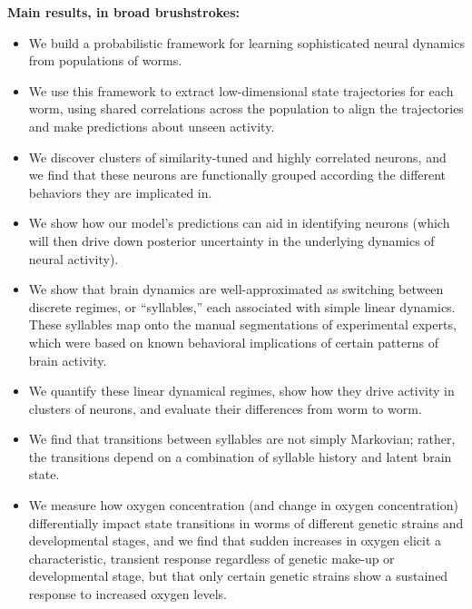 \documentclass[11pt]{article}
\begin{document}
\textbf{Main results, in broad brushstrokes:}
\begin{itemize}
\item We build a probabilistic framework for learning sophisticated neural dynamics from populations of worms.
\item We use this framework to extract low-dimensional state
  trajectories for each worm, using shared correlations across the
  population to align the trajectories and make predictions about
  unseen activity.
\item We discover clusters of similarity-tuned and highly correlated
  neurons, and we find that these neurons are functionally grouped
  according the different behaviors they are implicated in.
\item We show how our model's predictions can aid in identifying neurons (which will then drive down posterior uncertainty in the underlying dynamics of neural activity).
\item We show that brain dynamics are well-approximated as switching between discrete regimes, or ``syllables,'' each associated with simple linear dynamics.  These syllables map onto the manual segmentations of experimental experts, which were based on known behavioral implications of certain patterns of brain activity.
\item We quantify these linear dynamical regimes, show how they drive activity in clusters of neurons, and evaluate their differences from worm to worm.
\item We find that transitions between syllables are not simply Markovian; rather, the transitions depend on a combination of syllable history and latent brain state.
\item We measure how oxygen concentration (and change in oxygen concentration) differentially impact state transitions in worms of different genetic strains and developmental stages, and we find that sudden increases in oxygen elicit a characteristic, transient response regardless of genetic make-up or developmental stage, but that only certain genetic strains show a sustained response to increased oxygen levels. 
\end{itemize}
\end{document}
